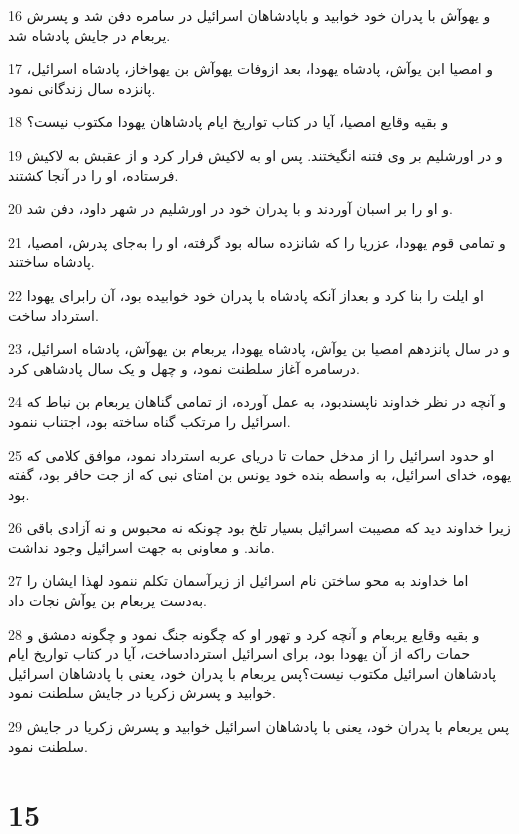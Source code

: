 \par 16 و یهوآش با پدران خود خوابید و باپادشاهان اسرائیل در سامره دفن شد و پسرش یربعام در جایش پادشاه شد.
\par 17 و امصیا ابن یوآش، پادشاه یهودا، بعد ازوفات یهوآش بن یهواخاز، پادشاه اسرائیل، پانزده سال زندگانی نمود.
\par 18 و بقیه وقایع امصیا، آیا در کتاب تواریخ ایام پادشاهان یهودا مکتوب نیست؟
\par 19 و در اورشلیم بر وی فتنه انگیختند. پس او به لاکیش فرار کرد و از عقبش به لاکیش فرستاده، او را در آنجا کشتند.
\par 20 و او را بر اسبان آوردند و با پدران خود در اورشلیم در شهر داود، دفن شد.
\par 21 و تمامی قوم یهودا، عزریا را که شانزده ساله بود گرفته، او را به‌جای پدرش، امصیا، پادشاه ساختند.
\par 22 او ایلت را بنا کرد و بعداز آنکه پادشاه با پدران خود خوابیده بود، آن رابرای یهودا استرداد ساخت.
\par 23 و در سال پانزدهم امصیا بن یوآش، پادشاه یهودا، یربعام بن یهوآش، پادشاه اسرائیل، درسامره آغاز سلطنت نمود، و چهل و یک سال پادشاهی کرد.
\par 24 و آنچه در نظر خداوند ناپسندبود، به عمل آورده، از تمامی گناهان یربعام بن نباط که اسرائیل را مرتکب گناه ساخته بود، اجتناب ننمود.
\par 25 او حدود اسرائیل را از مدخل حمات تا دریای عربه استرداد نمود، موافق کلامی که یهوه، خدای اسرائیل، به واسطه بنده خود یونس بن امتای نبی که از جت حافر بود، گفته بود.
\par 26 زیرا خداوند دید که مصیبت اسرائیل بسیار تلخ بود چونکه نه محبوس و نه آزادی باقی ماند. و معاونی به جهت اسرائیل وجود نداشت.
\par 27 اما خداوند به محو ساختن نام اسرائیل از زیرآسمان تکلم ننمود لهذا ایشان را به‌دست یربعام بن یوآش نجات داد.
\par 28 و بقیه وقایع یربعام و آنچه کرد و تهور او که چگونه جنگ نمود و چگونه دمشق و حمات راکه از آن یهودا بود، برای اسرائیل استردادساخت، آیا در کتاب تواریخ ایام پادشاهان اسرائیل مکتوب نیست؟پس یربعام با پدران خود، یعنی با پادشاهان اسرائیل خوابید و پسرش زکریا در جایش سلطنت نمود.
\par 29 پس یربعام با پدران خود، یعنی با پادشاهان اسرائیل خوابید و پسرش زکریا در جایش سلطنت نمود.
 
\chapter{15}

